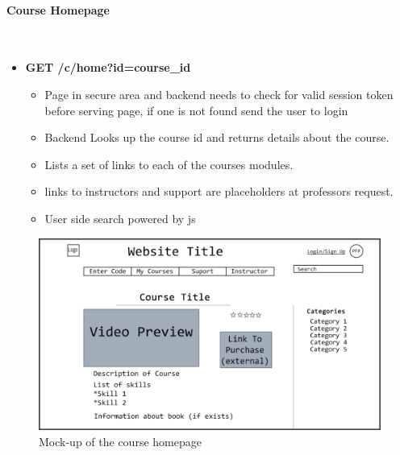 \documentclass{article}
\begin{document}
\paragraph{Course Homepage}\\
\begin{itemize}
    \item \textbf{GET /c/home?id=course\_id}
        \begin{itemize}
        \item Page in secure area and backend needs to check for valid session token before serving page, if one is not found send the user to login
        \item Backend Looks up the course id and returns details about the course.
        \item Lists a set of links to each of the courses modules.
        \item links to instructors and support are placeholders at professors request.
        \item User side search powered by js
    \end{itemize}
\end{itemize}
\begin{figure}[h]
    \caption{Mock-up of the course homepage}
    \includegraphics[width=\textwidth]{course_preview}
\end{figure}

\newpage
\end{document}
